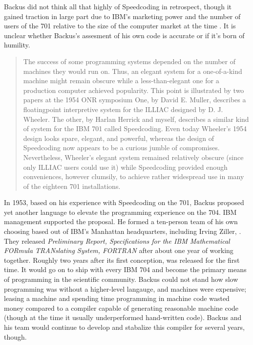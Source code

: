 Backus did not think all that highly of Speedcoding in retrospect, though it
gained traction in large part due to IBM's marketing power and the number of
users of the 701 relative to the size of the computer market at the time
\cite{Backus_1980_Programming_in_America_in_1950s}.
It is unclear whether Backus's assesment of his own code is accurate or if
it's born of humility.

\begin{quotation}
    The success of some programming systems depended on the number of machines 
they would run on. Thus, an elegant system for a one-of-a-kind machine might 
remain obscure while a less-than-elegant one for a production computer achieved 
popularity. This point is illustrated by two papers at the 1954 ONR symposium 
One, by David E. Muller, describes a floatingpoint interpretive system for 
the ILLIAC designed by D. J. Wheeler. The other, by Harlan Herrick and myself, 
describes a similar kind of system for the IBM 701 called Speedcoding. Even 
today Wheeler's 1954 design looks spare, elegant, and powerful, whereas the 
design of Speedcoding now appears to be a curious jumble of compromises. 
Nevertheless, Wheeler's elegant system remained relatively obscure (since only 
ILLIAC users could use it) while Speedcoding provided enough conveniences, 
however clumsily, to achieve rather widespread use in many of the eighteen 701 
installations. 
\end{quotation}

In 1953, based on his experience with Speedcoding on the 701, Backus proposed yet another language to elevate the programming experience on the 704.
IBM management supported the proposal.
He formed a ten-person team of his own choosing based out of IBM's Manhattan headquarters,
including Irving Ziller, .
They released \textit{Preliminary Report, Specifications for the IBM Mathematical FORmula TRANslating System, FORTRAN}\cite{IBM_1954_FORTRAN_Specifications}
after about one year of working together.
Roughly two years after its first conception, \FTN{} was released for the first time.
It would go on to ship with every IBM 704 and become the primary means
of programming in the scientific community.
Backus could not stand how slow programming was without a higher-level langauge, and
machines were expensive; leasing a machine and spending time programming in machine code
wasted money compared to a compiler capable of generating reasonable machine code
(though at the time it usually underperformed hand-written code).
Backus and his team would continue to develop and stabalize this compiler for several years,
though.

